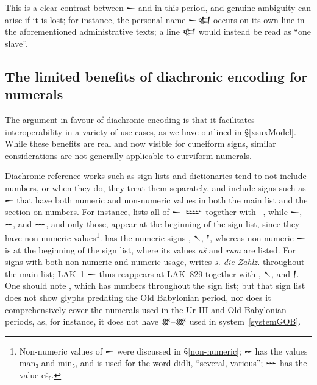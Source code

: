 \documentclass[10pt, a4paper, twoside]{article}
\newcommand\oneAšC{{\proposalfont\symbol{"12550}}} %
\newcommand\nineAšC{{\proposalfont\symbol{"12558}}} %
\begin{document}
This is a clear contrast between {\xsuxfont 𒀸} and {\oneAšC} in this period,
and genuine ambiguity can arise if it is lost; for instance, the personal name
{\xsuxfont 𒀸𒊕} occurs on its own line in the aforementioned administrative texts;
a line {\oneAšC\xsuxfont 𒊕} would instead be read as ``one slave''.

\subsection{The limited benefits of diachronic encoding for numerals}
\label{limitedBenefitsOfDiachrony}
The argument in favour of diachronic encoding is that it facilitates
interoperability in a variety of use cases,
as we have outlined in §\ref{xsuxModel}.
While these benefits are real and now visible for cuneiform signs,
similar considerations are not generally applicable to curviform numerals.

Diachronic reference works such as sign lists and dictionaries tend to not include numbers,
or when they do, they treat them separately, and include signs such as {\xsuxfont 𒀸}
that have both numeric and non-numeric values in both the main list and the section on numbers.
For instance, \cite[123 \psqq]{KWU} lists all of {\xsuxfont 𒀸}--{\xsuxfont 𒐇} together with
{\oneAšC}--{\nineAšC},
while {\xsuxfont 𒀸}, {\xsuxfont 𒐀}, and {\xsuxfont 𒐁}, and only those, appear at the beginning of the sign list,
since they have non-numeric values\footnote{Non-numeric values of {\xsuxfont 𒀸} were discussed in
§\ref{non-numeric};
{\xsuxfont 𒐀} has the values man₃ and min₅, and is used for the word didli, ``several, various'';
{\xsuxfont 𒐁} has the value eš₆.}.
\cite[58]{PTACE} has the numeric signs {\oneAšC}, {\xsuxfont 𒀹}, {\xsuxfont 𒁹},
whereas non-numeric {\xsuxfont 𒀸} is at the beginning of the sign list,
where its values \emph{aš} and \emph{rum} are listed.
For signs with both non-numeric and numeric usage, \cite{LAK} writes \emph{\textgerman{s. die Zahlz.}}
throughout the main list; LAK~1 {\xsuxfont 𒀸} thus reappears at LAK~829 together with
{\oneAšC}, {\xsuxfont 𒀹}, and {\xsuxfont 𒁹}.
One should note \cite{MZL}, which has numbers throughout the sign list;
but that sign list does not show glyphs predating the Old Babylonian period,
nor does it comprehensively cover the numerals used in the Ur III and Old Babylonian
periods, as, for instance, it does not have {\xsuxfont 𒐒}--{\xsuxfont 𒐔} used in
system~\ref{systemGOB}.
\end{document}
